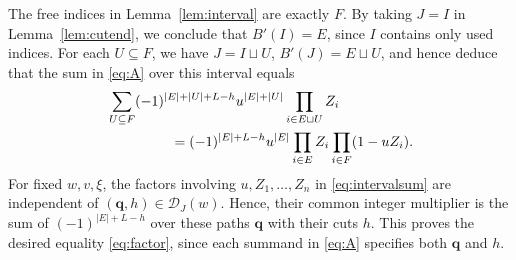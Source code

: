 \documentclass[11pt,a4paper,reqno]{amsart}
\DeclareRobustCommand{\rev}[1]{{\color{revision}#1}}
\numberwithin{equation}{section}
\theoremstyle{definition}
\newcommand{\qq}{\mathbf q}
\begin{document}
The free indices in Lemma~\ref{lem:interval} are exactly \(F\). By taking \(J=I\) in Lemma~\ref{lem:cutend}, we conclude that \(B'(I)=E\), since \(I\) contains only used indices. For each \(U\subseteq F\), we have \(J=I\sqcup U\), \(B'(J)=E\sqcup U\), and hence deduce that the sum in \eqref{eq:A} over this interval equals
\begin{align}
 &\sum_{U\subseteq F}(-1)^{|E|+|U|+L-h}u^{|E|+|U|}\prod_{i\in E\sqcup U} Z_i
 \notag\\
 &\hspace{16mm}=
 (-1)^{|E|+L-h}u^{|E|}\prod_{i\in E}Z_i\prod_{i\in F}(1-uZ_i).
 \label{eq:intervalsum}
\end{align}
\rev{For fixed \(w,v,\xi\), the factors involving \(u,Z_1,\ldots,Z_n\) in \eqref{eq:intervalsum} are independent of \((\qq,h) \in \mathcal{D}_J(w)\). Hence, their common integer multiplier is the sum of \((-1)^{|E|+L-h}\) over these paths \(\qq\) with their cuts \(h\). This proves the desired equality \eqref{eq:factor}, since each summand in \eqref{eq:A} specifies both \(\qq\) and \(h\).}
\end{document}
